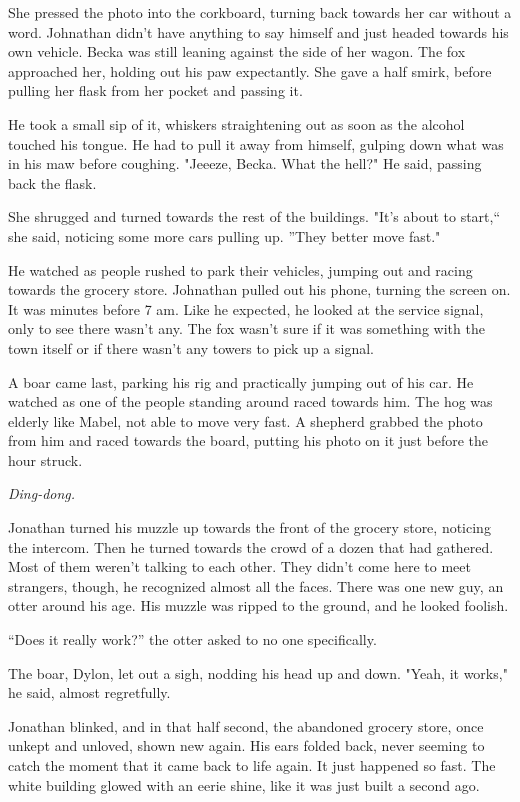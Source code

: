 She pressed the photo into the corkboard, turning back towards her car
without a word. Johnathan didn't have anything to say himself and just
headed towards his own vehicle. Becka was still leaning against the side
of her wagon. The fox approached her, holding out his paw expectantly.
She gave a half smirk, before pulling her flask from her pocket and
passing it.

He took a small sip of it, whiskers straightening out as soon as the
alcohol touched his tongue. He had to pull it away from himself, gulping
down what was in his maw before coughing. "Jeeeze, Becka. What the
hell?" He said, passing back the flask.

She shrugged and turned towards the rest of the buildings. "It's about
to start,`` she said, noticing some more cars pulling up. ''They better
move fast."

He watched as people rushed to park their vehicles, jumping out and
racing towards the grocery store. Johnathan pulled out his phone,
turning the screen on. It was minutes before 7 am. Like he expected, he
looked at the service signal, only to see there wasn't any. The fox
wasn't sure if it was something with the town itself or if there wasn't
any towers to pick up a signal.

A boar came last, parking his rig and practically jumping out of his
car. He watched as one of the people standing around raced towards him.
The hog was elderly like Mabel, not able to move very fast. A shepherd
grabbed the photo from him and raced towards the board, putting his
photo on it just before the hour struck.

\emph{Ding-dong.}

Jonathan turned his muzzle up towards the front of the grocery store,
noticing the intercom. Then he turned towards the crowd of a dozen that
had gathered. Most of them weren't talking to each other. They didn't
come here to meet strangers, though, he recognized almost all the faces.
There was one new guy, an otter around his age. His muzzle was ripped to
the ground, and he looked foolish.

``Does it really work?'' the otter asked to no one specifically.

The boar, Dylon, let out a sigh, nodding his head up and down. "Yeah, it
works," he said, almost regretfully.

Jonathan blinked, and in that half second, the abandoned grocery store,
once unkept and unloved, shown new again. His ears folded back, never
seeming to catch the moment that it came back to life again. It just
happened so fast. The white building glowed with an eerie shine, like it
was just built a second ago.

